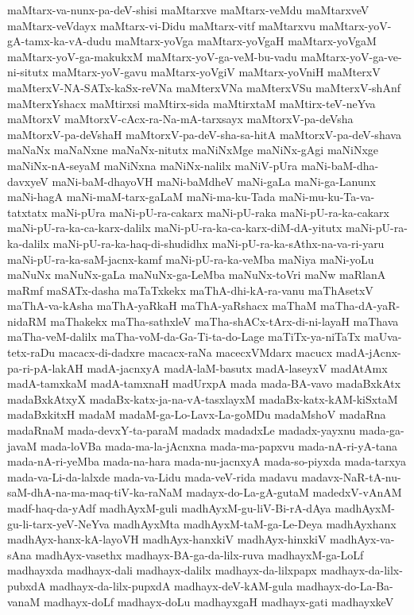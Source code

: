 {maMtarx-va-nunx-pa-deV-shisi
maMtarxve
maMtarx-veMdu
maMtarxveV
maMtarx-veVdayx
maMtarx-vi-Didu
maMtarx-vitf
maMtarxvu
maMtarx-yoV-gA-tamx-ka-vA-dudu
maMtarx-yoVga
maMtarx-yoVgaH
maMtarx-yoVgaM
maMtarx-yoV-ga-makukxM
maMtarx-yoV-ga-veM-bu-vadu
maMtarx-yoV-ga-ve-ni-situtx
maMtarx-yoV-gavu
maMtarx-yoVgiV
maMtarx-yoVniH
maMterxV
maMterxV-NA-SATx-kaSx-reVNa
maMterxVNa
maMterxVSu
maMterxV-shAnf
maMterxYshacx
maMtirxsi
maMtirx-sida
maMtirxtaM
maMtirx-teV-neYva
maMtorxV
maMtorxV-cAcx-ra-Na-mA-tarxsayx
maMtorxV-pa-deVsha
maMtorxV-pa-deVshaH
maMtorxV-pa-deV-sha-sa-hitA
maMtorxV-pa-deV-shava
maNaNx
maNaNxne
maNaNx-nitutx
maNiNxMge
maNiNx-gAgi
maNiNxge
maNiNx-nA-seyaM
maNiNxna
maNiNx-nalilx
maNiV-pUra
maNi-baM-dha-davxyeV
maNi-baM-dhayoVH
maNi-baMdheV
maNi-gaLa
maNi-ga-Lanunx
maNi-hagA
maNi-maM-tarx-gaLaM
maNi-ma-ku-Tada
maNi-mu-ku-Ta-va-tatxtatx
maNi-pUra
maNi-pU-ra-cakarx
maNi-pU-raka
maNi-pU-ra-ka-cakarx
maNi-pU-ra-ka-ca-karx-dalilx
maNi-pU-ra-ka-ca-karx-diM-dA-yitutx
maNi-pU-ra-ka-dalilx
maNi-pU-ra-ka-haq-di-shudidhx
maNi-pU-ra-ka-sAthx-na-va-ri-yaru
maNi-pU-ra-ka-saM-jacnx-kamf
maNi-pU-ra-ka-veMba
maNiya
maNi-yoLu
maNuNx
maNuNx-gaLa
maNuNx-ga-LeMba
maNuNx-toVri
maNw
maRlanA
maRmf
maSATx-dasha
maTaTxkekx
maThA-dhi-kA-ra-vanu
maThAsetxV
maThA-va-kAsha
maThA-yaRkaH
maThA-yaRshacx
maThaM
maTha-dA-yaR-nidaRM
maThakekx
maTha-sathxleV
maTha-shACx-tArx-di-ni-layaH
maThava
maTha-veM-dalilx
maTha-voM-da-Ga-Ti-ta-do-Lage
maTiTx-ya-niTaTx
maUva-tetx-raDu
macacx-di-dadxre
macacx-raNa
macecxVMdarx
macucx
madA-jAcnx-pa-ri-pA-lakAH
madA-jacnxyA
madA-laM-basutx
madA-laseyxV
madAtAmx
madA-tamxkaM
madA-tamxnaH
madUrxpA
mada
mada-BA-vavo
madaBxkAtx
madaBxkAtxyX
madaBx-katx-ja-na-vA-tasxlayxM
madaBx-katx-kAM-kiSxtaM
madaBxkitxH
madaM
madaM-ga-Lo-Lavx-La-goMDu
madaMshoV
madaRna
madaRnaM
mada-devxY-ta-paraM
madadx
madadxLe
madadx-yayxnu
mada-ga-javaM
mada-loVBa
mada-ma-la-jAcnxna
mada-ma-papxvu
mada-nA-ri-yA-tana
mada-nA-ri-yeMba
mada-na-hara
mada-nu-jacnxyA
mada-so-piyxda
mada-tarxya
mada-va-Li-da-lalxde
mada-va-Lidu
mada-veV-rida
madavu
madavx-NaR-tA-nu-saM-dhA-na-ma-maq-tiV-ka-raNaM
madayx-do-La-gA-gutaM
madedxV-vAnAM
madf-haq-da-yAdf
madhAyxM-guli
madhAyxM-gu-liV-Bi-rA-dAya
madhAyxM-gu-li-tarx-yeV-NeYva
madhAyxMta
madhAyxM-taM-ga-Le-Deya
madhAyxhanx
madhAyx-hanx-kA-layoVH
madhAyx-hanxkiV
madhAyx-hinxkiV
madhAyx-va-sAna
madhAyx-vasethx
madhayx-BA-ga-da-lilx-ruva
madhayxM-ga-LoLf
madhayxda
madhayx-dali
madhayx-dalilx
madhayx-da-lilxpapx
madhayx-da-lilx-pubxdA
madhayx-da-lilx-pupxdA
madhayx-deV-kAM-gula
madhayx-do-La-Ba-vanaM
madhayx-doLf
madhayx-doLu
madhayxgaH
madhayx-gati
madhayxkeV
}
